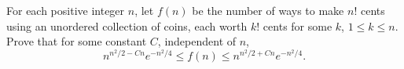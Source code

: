 For each positive integer $n$, let $f(n)$ be the number of ways to
make $n!$ cents using an unordered collection of coins, each worth $k!$
cents for some $k$, $1 \leq k \leq n$. Prove that for some constant $C$,
independent of $n$,
\[
n^{n^2/2 - Cn} e^{-n^2/4} \leq f(n) \leq n^{n^2/2 + Cn}e^{-n^2/4}.
\]

